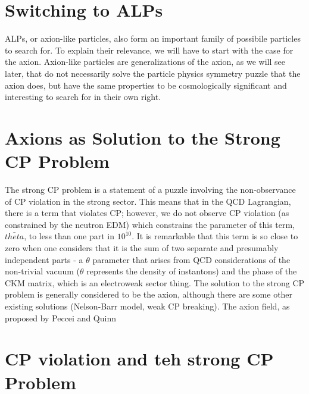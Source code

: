 \documentclass[11pt]{book}
\begin{document}
\section{Switching to ALPs}

ALPs, or axion-like particles, also form an important family of possibile particles to search for. To explain their relevance, we will have to start with the case for the axion. Axion-like particles are generalizations of the axion, as we will see later, that do not necessarily solve the particle physics symmetry puzzle that the axion does, but have the same properties to be cosmologically significant and interesting to search for in their own right.

\section{Axions as Solution to the Strong CP Problem}

The strong CP problem is a statement of a puzzle involving the non-observance of CP violation in the strong sector. This means that in the QCD Lagrangian, there is a term that violates CP; however, we do not observe CP violation (as constrained by the neutron EDM) which constrains the parameter of this term, $\bar{theta}$, to less than one part in $10^{10}$. It is remarkable that this term is so close to zero when one considers that it is the sum of two separate and presumably independent parts - a $\theta$ parameter that arises from QCD considerations of the non-trivial vacuum ($\theta$ represents the density of instantons) and the phase of the CKM matrix, which is an electroweak sector thing. The solution to the strong CP problem is generally considered to be the axion, although there are some other existing solutions (Nelson-Barr model, weak CP breaking). The axion field, as proposed by Peccei and Quinn



\section{ CP violation and teh strong CP Problem}
\end{document}
